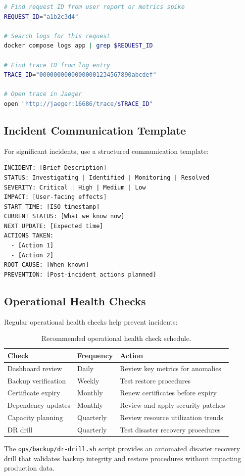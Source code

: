 \begin{lstlisting}[language=bash, caption={Cross-pillar correlation example}]
# Find request ID from user report or metrics spike
REQUEST_ID="a1b2c3d4"

# Search logs for this request
docker compose logs app | grep $REQUEST_ID

# Find trace ID from log entry
TRACE_ID="00000000000000001234567890abcdef"

# Open trace in Jaeger
open "http://jaeger:16686/trace/$TRACE_ID"
\end{lstlisting}

\subsection{Incident Communication Template}

For significant incidents, use a structured communication template:

\begin{lstlisting}[language=text, caption={Incident communication template}]
INCIDENT: [Brief Description]
STATUS: Investigating | Identified | Monitoring | Resolved
SEVERITY: Critical | High | Medium | Low
IMPACT: [User-facing effects]
START TIME: [ISO timestamp]
CURRENT STATUS: [What we know now]
NEXT UPDATE: [Expected time]
ACTIONS TAKEN:
  - [Action 1]
  - [Action 2]
ROOT CAUSE: [When known]
PREVENTION: [Post-incident actions planned]
\end{lstlisting}

\subsection{Operational Health Checks}

Regular operational health checks help prevent incidents:

\begin{table}[ht]
\centering
\caption{Recommended operational health check schedule.}
\label{tab:health-checks}
\begin{tabular}{llp{6cm}}
\hline
\textbf{Check} & \textbf{Frequency} & \textbf{Action} \\
\hline
Dashboard review & Daily & Review key metrics for anomalies \\
Backup verification & Weekly & Test restore procedures \\
Certificate expiry & Monthly & Renew certificates before expiry \\
Dependency updates & Monthly & Review and apply security patches \\
Capacity planning & Quarterly & Review resource utilization trends \\
DR drill & Quarterly & Test disaster recovery procedures \\
\hline
\end{tabular}
\end{table}

The \texttt{ops/backup/dr-drill.sh} script provides an automated disaster recovery drill that validates backup integrity and restore procedures without impacting production data.

